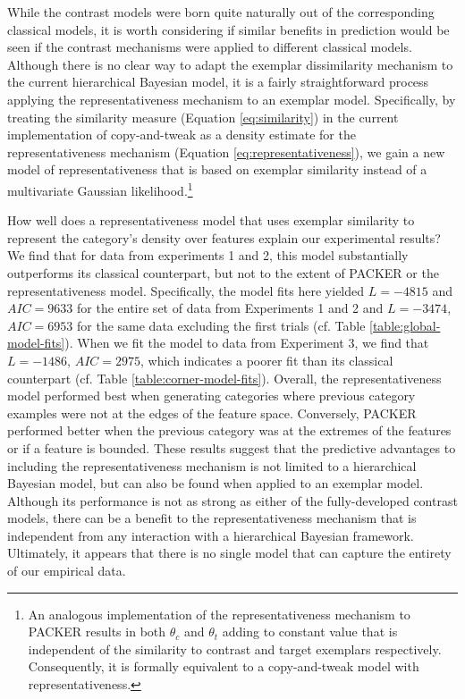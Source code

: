 \documentclass[pdflatex,sn-apa]{sn-jnl}%
\theoremstyle{thmstyleone}%
\theoremstyle{thmstyletwo}%
\theoremstyle{thmstylethree}%
\begin{document}
While the contrast models were born quite naturally out of the corresponding
classical models, it is worth considering if similar benefits in prediction
would be seen if the contrast mechanisms were applied to different classical
models. Although there is no clear way to adapt the exemplar dissimilarity
mechanism to the current hierarchical Bayesian model, it is a fairly
straightforward process applying the representativeness mechanism to an exemplar
model. Specifically, by treating the similarity measure (Equation
\ref{eq:similarity}) in the current implementation of copy-and-tweak as a
density estimate for the representativeness mechanism (Equation
\ref{eq:representativeness}), we gain a new model of representativeness that is
based on exemplar similarity instead of a multivariate Gaussian
likelihood.\footnote{An analogous implementation of the representativeness
  mechanism to PACKER results in both $\theta_c$ and $\theta_t$ adding to
  constant value that is independent of the similarity to contrast and target
  exemplars respectively. Consequently, it is formally equivalent to a
  copy-and-tweak model with representativeness.}

How well does a representativeness model that uses exemplar similarity to
represent the category's density over features explain our experimental results?
We find that for data from experiments 1 and 2, this model substantially
outperforms its classical counterpart, but not to the extent of PACKER or the
representativeness model. Specifically, the model fits here yielded $L = -4815$
and $AIC=9633$ for the entire set of data from Experiments 1 and 2 and
$L = -3474$, $AIC=6953$ for the same data excluding the first trials (cf. Table
\ref{table:global-model-fits}). When we fit the model to data from Experiment 3,
we find that $L = -1486$, $AIC = 2975$, which indicates a poorer fit than its
classical counterpart (cf. Table \ref{table:corner-model-fits}). Overall, the
representativeness model performed best when generating categories where
previous category examples were not at the edges of the feature space.
Conversely, PACKER performed better when the previous category was at the
extremes of the features or if a feature is bounded. These results suggest that
the predictive advantages to including the representativeness mechanism is not
limited to a hierarchical Bayesian model, but can also be found when applied to
an exemplar model. Although its performance is not as strong as either of the
fully-developed contrast models, there can be a benefit to the
representativeness mechanism that is independent from any interaction with a
hierarchical Bayesian framework. Ultimately, it appears that there is no single
model that can capture the entirety of our empirical data.
\end{document}
